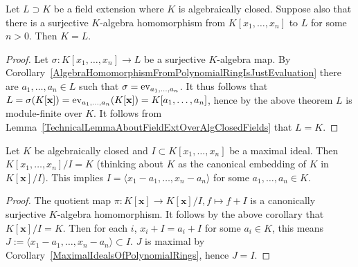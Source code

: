 \begin{corollary}\label{IfExistsSurjectiveAlgHomThenFieldExtOverAlgClosedFieldIsTrivial}
    Let $L\supset K$ be a field extension where $K$ is algebraically closed. Suppose also that there is a surjective $K$-algebra homomorphism from $K[x_1,\dots,x_n]$ to $L$ for some $n>0$. Then $K=L$. 
\end{corollary}
\begin{proof}
    Let $\sigma: K[x_1,\dots,x_n] \rightarrow L$ be a surjective $K$-algebra map. By Corollary~\ref{AlgebraHomomorphismFromPolynomialRingIsJustEvaluation} there are $a_1,\dots,a_n\in L$ such that $\sigma = \mathrm{ev}_{a_1,\dots,a_n}$. It thus follows that $L = \sigma(K[\mathbf{x}])=\mathrm{ev}_{a_1,\dots,a_n}(K[\mathbf{x}])=K[a_1,\dots,a_n]$, hence by the above theorem $L$ is module-finite over $K$. It follows from Lemma~\ref{TechnicalLemmaAboutFieldExtOverAlgClosedFields} that $L=K$. 
\end{proof}
\begin{corollary}\label{ClassificationOfMaximalPolynomialIdeals}
    Let $K$ be algebraically closed and $I\subset K[x_1,\dots,x_n]$ be a maximal ideal. Then $K[x_1,\dots,x_n]/I=K$ (thinking about $K$ as the canonical embedding of $K$ in $K[\mathbf{x}]/I$). This implies $I=\langle x_1-a_1,\dots,x_n-a_n\rangle$ for some $a_1,\dots,a_n\in K$. 
\end{corollary}
\begin{proof}
    The quotient map $\pi : K[\mathbf{x}]\rightarrow K[\mathbf{x}]/I, f\mapsto f+I$ is a canonically surjective $K$-algebra homomorphism. It follows by the above corollary that $K[\mathbf{x}]/I=K$. Then for each $i$, $x_i+I = a_i+ I$ for some $a_i\in K$, this means $J:=\langle x_1-a_1,\dots,x_n-a_n\rangle\subset I$. $J$ is maximal by Corollary~\ref{MaximalIdealsOfPolynomialRings}, hence $J=I$. 
\end{proof}

